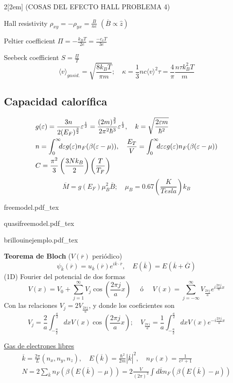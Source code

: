 \documentclass[leqno]{article}
\newcommand{\incfig}[1]{%
\begin{center}
\def\svgwidth{0.9\columnwidth}
{#1.pdf_tex}
\end{center}
}
\begin{document}
\begin{multicols}{2}[\columnsep2em]
(COSAS DEL EFECTO HALL PROBLEMA 4)

Hall resistivity $\rho _{xy}=-\rho_{yx} = \frac{B}{ne}$ $(\overline{B}\propto \hat{z} )$

Peltier coefficient $\Pi = -\frac{k_BT}{2e}= \frac{-c_vT}{3e}$

Seebeck coefficient $S = \frac{\Pi}{T}$
\[
  \langle v\rangle_{gas id.} = \sqrt{\frac{8k_BT}{\pi m}} ; \quad \kappa = \frac{1}{3} nc\langle v\rangle ^2\tau = \frac{4}{\pi }\frac{n\tau k_B^2T}{m}
\] 
\subsection{Capacidad calorífica}
\begin{align*}
  &g(\varepsilon ) = \frac{3n}{2(E_F)^{\frac{3}{2}}}\varepsilon ^{\frac{1}{2}} = \frac{(2m)^{\frac{3}{2}}}{2\pi ^2\hbar ^3}\varepsilon ^{\frac{1}{2}} , \quad k = \sqrt{\frac{2\varepsilon m}{\hbar ^2}}  \\
  & n = \int_0^\infty \hspace{-0.5em} d\varepsilon g(\varepsilon )n_F(\beta (\varepsilon -\mu )), \quad
  \frac{E_T}{V} = \int_0^\infty \hspace{-0.5em} d\varepsilon \varepsilon g(\varepsilon )n_F(\beta (\varepsilon -\mu ))\\
  & C = \frac{\pi ^2}{3}\left( \frac{3Nk_B}{2} \right) \left( \frac{T}{T_F} \right)
\end{align*}
\[
\overline{M} = g(E_F)\mu _B^2 \overline{B}; \quad \mu _B = 0.67 \left( \frac{K}{Tesla} \right) k_B
\] 
\incfig{freemodel}
\incfig{quasifreemodel}
\incfig{brillouinejemplo}

\textbf{Teorema de Bloch} ($V(\overline{r})$ periódico)
\[
  \psi _{\overline{k}} (\overline{r}) = u_{\overline{k}}(\overline{r})e^{i \overline{k}\cdot \overline{r}}, \quad E(\overline{k}) = E(\overline{k}+\overline{G})
\] 
(1D) Fourier del potencial de dos formas
\[
V(x)=V_0 + \sum _{j=1}^\infty V_j\cos\left( \frac{2\pi j}{a}x \right)  \quad \text{ ó } \quad 
V(x)=\sum_{j=-\infty}^\infty V_{\frac{2\pi j}{a}} e ^{i\frac{2\pi j}{a}x}
\]
Con las relaciones $V_j = 2 V_{\frac{2\pi j}{a}}$, y donde los coeficientes son
\[ V_j = \frac{2}{a} \int _{-\frac{a}{2}} ^{\frac{a}{2}} dx V(x)\cos\left( \frac{2\pi j}{a}x \right); \quad V_{\frac{2\pi j}{a}} = \frac{1}{a} \int _{-\frac{a}{2}} ^{\frac{a}{2}} dx V(x)e ^{-i\frac{2\pi j }{a}x}
\]

\underline{Gas de electrones libres}
\begin{align*}
\overline{k}=\frac{2\pi}{L}(n_x, n_y, n_z), \quad E(\overline{k})=\frac{\hbar ^2}{2m}|\overline{k}|^2, \quad n_F(x)=\frac{1}{e^x+1}\\
N = 2\sum_{\overline{k}} n_F(\beta(E(\overline{k})- \mu)) = 2 \frac{V}{(2\pi)^3}\int d \overline{k}n_F(\beta (E( \overline{k})-\mu))
\end{align*}


\end{multicols}
\end{document}
